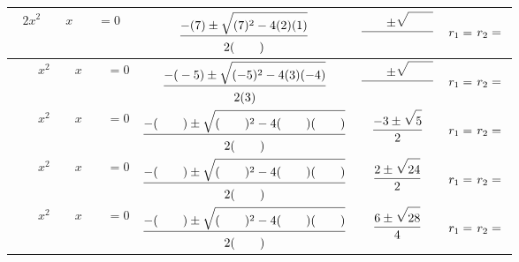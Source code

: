\documentclass[main.tex]{subfiles}
\begin{document}
\begin{exercise}
\begin{tabularx}{1\linewidth}{|c|c|c|X|}
$2x^2\qquad x\qquad = 0$
	& $\dfrac{-(\rule{0pt}{1.4em}7)\pm \sqrt{(7\rule{0pt}{1.1em})^2-4(2\rule{0pt}{1.1em})(1)}}{2( \rule{0pt}{1.1em}\qquad)}$
	& $\dfrac{\qquad\pm \sqrt{\qquad\rule{0pt}{1.1em} }}{\qquad}$
	& $r_1=\rule{0pt}{2.0em} $\newline $r_2= \rule{0pt}{1.6em}$ \\ \hline
$\qquad x^2\qquad x\qquad = 0$
	& $\dfrac{-(\rule{0pt}{1.4em}-5)\pm \sqrt{(-5\rule{0pt}{1.1em})^2-4(3\rule{0pt}{1.1em})(-4)}}{2(3\rule{0pt}{1.1em})}$
	& $\dfrac{\qquad\pm \sqrt{\qquad\rule{0pt}{1.1em} }}{\qquad}$
	& $r_1=\rule{0pt}{2.0em} $\newline $r_2= \rule{0pt}{1.6em}$ \\ \hline
$\qquad x^2\qquad x\qquad = 0$
	& $\dfrac{-(\rule{0pt}{1.4em}\qquad)\pm \sqrt{(\qquad\rule{0pt}{1.1em})^2-4(\qquad\rule{0pt}{1.1em})(\qquad)}}{2(\qquad\rule{0pt}{1.1em})}$
	& $\dfrac{-3\pm \sqrt{5\rule{0pt}{1.1em} }}{2}$
	& $r_1=\rule{0pt}{2.0em} $\newline $r_2= \rule{0pt}{1.6em}$ \\ \hline
$\qquad x^2\qquad x\qquad = 0$
	& $\dfrac{-(\rule{0pt}{1.4em}\qquad)\pm \sqrt{(\qquad\rule{0pt}{1.1em})^2-4(\qquad\rule{0pt}{1.1em})(\qquad)}}{2(\qquad\rule{0pt}{1.1em})}$
	& $\dfrac{2\pm \sqrt{24\rule{0pt}{1.1em} }}{2}$
	& $r_1=\rule{0pt}{2.0em} $\newline $r_2= \rule{0pt}{1.6em}$ \\ \hline 
$\qquad x^2\qquad x\qquad = 0$
	& $\dfrac{-(\rule{0pt}{1.4em}\qquad)\pm \sqrt{(\qquad\rule{0pt}{1.1em})^2-4(\qquad\rule{0pt}{1.1em})(\qquad)}}{2(\qquad\rule{0pt}{1.1em})}$
	& $\dfrac{6\pm \sqrt{28\rule{0pt}{1.1em} }}{4}$
	& $r_1=\rule{0pt}{2.0em} $\newline $r_2= \rule{0pt}{1.6em}$ \\ \hline
\end{tabularx} 
\end{exercise} 
\end{document}
